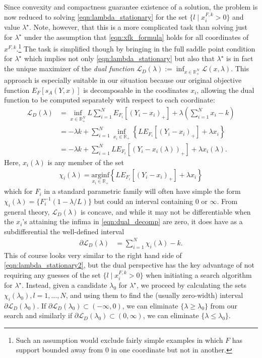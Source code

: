 \documentclass{article}
\begin{document}
Since convexity and compactness guarantee existence of a solution, the problem is now reduced to solving \eqref{eqn:lambda_stationary} for the set 
$\{l \mid x_i^{F,k} > 0\}$ and value $\lambda^{\star}$. Note, however, that this is a more complicated task than solving just 
for $\lambda^{\star}$ under the assumption that \eqref{eqn:xfk_formula} holds for all coordinates of $x^{F,k}$.\footnote{Such an assumption would exclude fairly simple examples in which $F$ has support bounded away from $0$ in one coordinate but not in another.} The task is simplified though by bringing in the full saddle point condition for $\lambda^{\star}$ which implies not only \eqref{eqn:lambda_stationary} but also that
$\lambda^{\star}$ is in fact the unique maximizer of the \emph{dual function} 
$\mathcal{L}_D(\lambda) := \inf_{x \in \mathbb{R}_{+}^N} \mathcal{L}(x, \lambda)$.
This approach is especially suitable in our situation because our original objective function $E_F\left[s_A(Y,x)\right]$ is decomposable in the coodinates $x_i$, allowing the dual function to be computed separately with respect to each coordinate:
\begin{align}
\mathcal{L}_D(\lambda) &= \inf_{x \in \mathbb{R}_{+}^N} L\sum_{i=1}^{N} E_{F_i}[(Y_i - x_i)_{+}] + \lambda\left(\sum_{i=1}^{N} x_i - k\right) \\
&= - \lambda k + \sum_{i=1}^{N} \inf_{x_i \in \mathbb{R}_{+}}\left\{ L E_{F_i}[(Y_i - x_i)_{+}] + \lambda x_i\right\}  \label{eqn:dual_decomp} \\
&= - \lambda k + \sum_{i=1}^{N}  LE_{F_i}[(Y_i - x_i(\lambda))_{+}] + \lambda x_i(\lambda).
\end{align}
Here, $x_i(\lambda)$ is any member of the set 
\begin{align}
\chi_i(\lambda) = \underset{x_i \in \mathbb{R}_{+}}{\mathrm{arginf}} \left\{ L E_{F_i}[(Y_i - x_i)_{+}] + \lambda x_i\right\}
\end{align}
which for $F_i$ in a standard parametric family will often have simple the form $\chi_i(\lambda) = \{F_i^{-1}(1-\lambda/L)\}$ but could an interval containing $0$ or $\infty$.
From general theory, $\mathcal{L}_D(\lambda)$ is concave, and while it may not be differentiable when the $x_i$'s attaining the infima in \eqref{eqn:dual_decomp} are zero, it does have as a subdifferential the well-defined interval
\begin{align}
\partial \mathcal{L}_D(\lambda) 
&= \sum_{i=1}^N \chi_i(\lambda) - k.
\end{align}
This of course looks very similar to the right hand side of \eqref{eqn:lambda_stationary2}, but the dual perspective has the key advantage of not requiring any guesses of the set $\{l \mid x_i^{F,k} > 0\}$ when initiating a search algorithm for $\lambda^{\star}$.  Instead, given a candidate $\lambda_0$ for $\lambda^{\star}$, we proceed by calculating the sets $\chi_i(\lambda_0), l = 1,\ldots,N$, and using them to find the (usually zero-width) interval $\partial \mathcal{L}_D(\lambda_0)$. If $\partial \mathcal{L}_D(\lambda_0) \subset (-\infty,0)$, we can eliminate $\{\lambda \geq \lambda_0\}$ from our search and similarly if $\partial \mathcal{L}_D(\lambda_0) \subset (0, \infty)$, we can eliminate $\{\lambda \leq \lambda_0\}$. 
\end{document}
